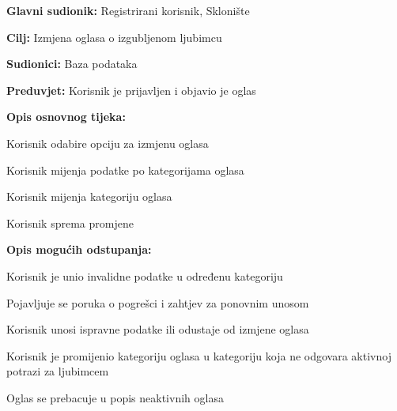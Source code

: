					\noindent {}
					\begin{packed_item}
						
						\item \textbf{Glavni sudionik: }Registrirani korisnik, Sklonište
						\item  \textbf{Cilj:} Izmjena oglasa o izgubljenom ljubimcu
						\item  \textbf{Sudionici:} Baza podataka
						\item  \textbf{Preduvjet:} Korisnik je prijavljen i objavio je oglas
						\item  \textbf{Opis osnovnog tijeka:}
						
						\item[] \begin{packed_enum}
							
							\item Korisnik odabire opciju za izmjenu oglasa
							\item 
								\begin{packed_item}
									\item[a$)$] Korisnik mijenja podatke po kategorijama oglasa
									\item[b$)$] Korisnik mijenja kategoriju oglasa 
								\end{packed_item}
							\item Korisnik sprema promjene
						\end{packed_enum}
						
						\item  \textbf{Opis mogućih odstupanja:}
						
						\item[] \begin{packed_item}
							
							\item[2.a] Korisnik je unio invalidne podatke u određenu kategoriju
							\item[] \begin{packed_enum}
								
								\item  Pojavljuje se poruka o pogrešci i zahtjev za ponovnim unosom
								\item Korisnik unosi ispravne podatke ili odustaje od izmjene oglasa
								
							\end{packed_enum}
							\item[2.b] Korisnik je promijenio kategoriju oglasa u kategoriju koja ne odgovara aktivnoj potrazi za ljubimcem
							\begin{packed_enum}
								
								\item Oglas se prebacuje u popis neaktivnih oglasa
								
							\end{packed_enum}
							
						\end{packed_item}
					\end{packed_item}
